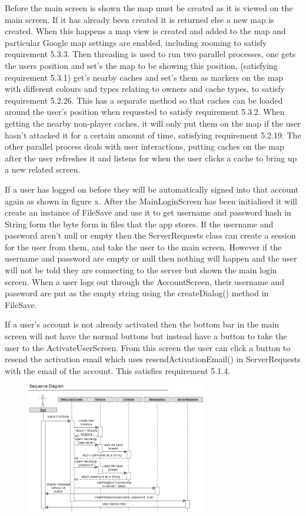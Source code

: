 Before the main screen is shown the map must be created as it is viewed on the main screen. If it has already been created it is returned else a new map is created. When this happens a map view is created and added to the map and particular Google map settings are enabled, including zooming to satisfy requirement 5.3.3. Then threading is used to run two parallel processes, one gets the users position and set's the map to be showing this position, (satisfying requirement 5.3.1) get's nearby caches and set's them as markers on the map with different colours and types relating to owners and cache types, to satisfy requirement 5.2.26. This has a separate method so that caches can be loaded around the user's position when requested to satisfy requirement 5.3.2. When getting the nearby non-player caches, it will only put them on the map if the user hasn't attacked it for a certain amount of time, satisfying requirement 5.2.19. The other parallel process deals with user interactions, putting caches on the map after the user refreshes it and listens for when the user clicks a cache to bring up a new related screen.

If a user has logged on before they will be automatically signed into that account again as shown in figure x. After the MainLoginScreen has been initialised it will create an instance of FileSave and use it to get username and password hash in String form the byte form in files that the app stores. If the username and password aren't null or empty then the ServerRequests class can create a session for the user from them, and take the user to the main screen. However if the username and password are empty or null then nothing will happen and the user will not be told they are connecting to the server but shown the main login screen. When a user logs out through the AccountScreen, their username and password are put as the empty string using the createDialog() method in FileSave.

If a user's account is not already activated then the bottom bar in the main screen will not have the normal buttons but instead have a button to take the user to the ActivateUserScreen. From this screen the user can click a button to resend the activation email which uses resendActivationEmail() in ServerRequests with the email of the account. This satisfies requirement 5.1.4.

\begin{figure}
    \includegraphics[width=0.7\textwidth]{images/sequence/autosave}
\end{figure}

